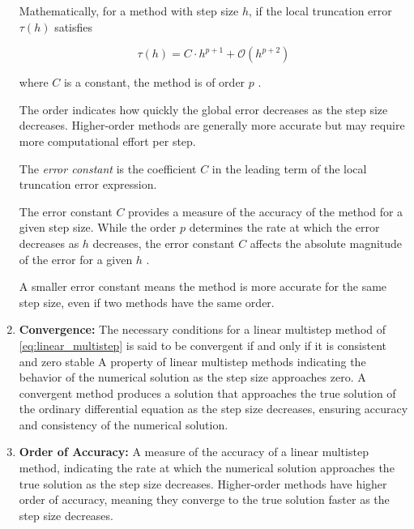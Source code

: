 \begin{enumerate}
Mathematically, for a method with step size \( h \), if the local truncation error \( \tau(h) \) satisfies

\begin{equation}
  \tau(h) = C \cdot h^{p+1} + \mathcal{O}(h^{p+2})
\end{equation}

where \( C \) is a constant, the method is of order \( p \) \cite{BUTCHER20091834}.

The order indicates how quickly the global error decreases as the step size decreases. Higher-order methods are generally more accurate but may require more computational effort per step.


The \textit{error constant} is the coefficient \( C \) in the leading term of the local truncation error expression.

The error constant \( C \) provides a measure of the accuracy of the method for a given step size. While the order \( p \) determines the rate at which the error decreases as \( h \) decreases, the error constant \( C \) affects the absolute magnitude of the error for a given \( h \) \cite{atkinson1989introduction}.

A smaller error constant means the method is more accurate for the same step size, even if two methods have the same order.

    
    \item \textbf{Convergence:} 
    The necessary conditions for a linear multistep method of \eqref{eq:linear_multistep} is said to be convergent if and only if it is consistent and zero stable
    A property of linear multistep methods indicating the behavior of the numerical solution as the step size approaches zero. A convergent method produces a solution that approaches the true solution of the ordinary differential equation as the step size decreases, ensuring accuracy and consistency of the numerical solution.
    
    \item \textbf{Order of Accuracy:} A measure of the accuracy of a linear multistep method, indicating the rate at which the numerical solution approaches the true solution as the step size decreases. Higher-order methods have higher order of accuracy, meaning they converge to the true solution faster as the step size decreases.
\end{enumerate}
